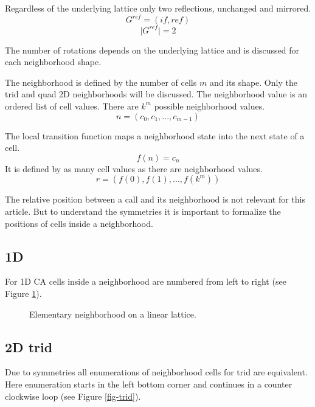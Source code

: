 \documentclass{ijuc}
\begin{document}
Regardless of the underlying lattice only two reflections, unchanged and mirrored.
\[ G^{ref} = (if, ref) \]
\[ \vert G^{ref} \vert = 2 \]

The number of rotations depends on the underlying lattice and is discussed for each neighborhood shape.

The neighborhood is defined by the number of cells \(m\) and its shape.
Only the trid and quad 2D neighborhoods will be discussed.
The neighborhood value is an ordered list of cell values. There are \(k^m\) possible neighborhood values.
\[ n = (c_0, c_1, ..., c_{m-1}) \]

The local transition function maps a neighborhood state into the next state of a cell.
\[ f(n) = c_n \]
It is defined by as many cell values as there are neighborhood values.
\[ r = (f(0), f(1), ..., f(k^m)) \]

The relative position between a call and its neighborhood is not relevant for this article.
But to understand the symmetries it is important to formalize the positions of cells inside a neighborhood.

\subsection{1D}

For 1D CA cells inside a neighborhood are numbered from left to right (see Figure \ref{fig-linear}).

\begin{figure}
\begin{center}
\end{center}
\caption{Elementary neighborhood on a linear lattice.}
\label{fig-linear}
\end{figure}

\subsection{2D trid}

Due to symmetries all enumerations of neighborhood cells for trid are equivalent.
Here enumeration starts in the left bottom corner and continues in a counter clockwise loop (see Figure \ref{fig-trid}).
\end{document}
